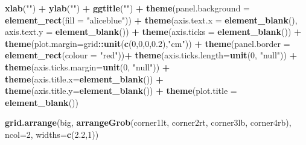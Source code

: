 \documentclass[12pt,oneside]{reedthesis}
\newenvironment{Shaded}{\begin{snugshade}}{\end{snugshade}}
\newcommand{\DataTypeTok}[1]{\textcolor[rgb]{0.13,0.29,0.53}{#1}}
\newcommand{\DecValTok}[1]{\textcolor[rgb]{0.00,0.00,0.81}{#1}}
\newcommand{\FloatTok}[1]{\textcolor[rgb]{0.00,0.00,0.81}{#1}}
\newcommand{\KeywordTok}[1]{\textcolor[rgb]{0.13,0.29,0.53}{\textbf{#1}}}
\newcommand{\NormalTok}[1]{#1}
\newcommand{\OperatorTok}[1]{\textcolor[rgb]{0.81,0.36,0.00}{\textbf{#1}}}
\newcommand{\StringTok}[1]{\textcolor[rgb]{0.31,0.60,0.02}{#1}}
\begin{document}
\begin{Shaded}
\begin{Highlighting}[]
\StringTok{  }\KeywordTok{xlab}\NormalTok{(}\StringTok{""}\NormalTok{) }\OperatorTok{+}\StringTok{ }
\StringTok{  }\KeywordTok{ylab}\NormalTok{(}\StringTok{""}\NormalTok{) }\OperatorTok{+}\StringTok{ }
\StringTok{  }\KeywordTok{ggtitle}\NormalTok{(}\StringTok{""}\NormalTok{) }\OperatorTok{+}
\StringTok{  }\KeywordTok{theme}\NormalTok{(}\DataTypeTok{panel.background =} \KeywordTok{element_rect}\NormalTok{(}\DataTypeTok{fill =} \StringTok{"aliceblue"}\NormalTok{)) }\OperatorTok{+}
\StringTok{  }\KeywordTok{theme}\NormalTok{(}\DataTypeTok{axis.text.x =} \KeywordTok{element_blank}\NormalTok{(), }\DataTypeTok{axis.text.y =} \KeywordTok{element_blank}\NormalTok{()) }\OperatorTok{+}
\StringTok{  }\KeywordTok{theme}\NormalTok{(}\DataTypeTok{axis.ticks =} \KeywordTok{element_blank}\NormalTok{()) }\OperatorTok{+}
\StringTok{  }\KeywordTok{theme}\NormalTok{(}\DataTypeTok{plot.margin=}\NormalTok{grid}\OperatorTok{::}\KeywordTok{unit}\NormalTok{(}\KeywordTok{c}\NormalTok{(}\DecValTok{0}\NormalTok{,}\DecValTok{0}\NormalTok{,}\DecValTok{0}\NormalTok{,}\FloatTok{0.2}\NormalTok{),}\StringTok{"cm"}\NormalTok{)) }\OperatorTok{+}\StringTok{ }
\StringTok{  }\KeywordTok{theme}\NormalTok{(}\DataTypeTok{panel.border =} \KeywordTok{element_rect}\NormalTok{(}\DataTypeTok{colour =} \StringTok{"red"}\NormalTok{))}\OperatorTok{+}
\StringTok{  }\KeywordTok{theme}\NormalTok{(}\DataTypeTok{axis.ticks.length=}\KeywordTok{unit}\NormalTok{(}\DecValTok{0}\NormalTok{, }\StringTok{"null"}\NormalTok{)) }\OperatorTok{+}
\StringTok{  }\KeywordTok{theme}\NormalTok{(}\DataTypeTok{axis.ticks.margin=}\KeywordTok{unit}\NormalTok{(}\DecValTok{0}\NormalTok{, }\StringTok{"null"}\NormalTok{)) }\OperatorTok{+}
\StringTok{  }\KeywordTok{theme}\NormalTok{(}\DataTypeTok{axis.title.x=}\KeywordTok{element_blank}\NormalTok{()) }\OperatorTok{+}
\StringTok{  }\KeywordTok{theme}\NormalTok{(}\DataTypeTok{axis.title.y=}\KeywordTok{element_blank}\NormalTok{()) }\OperatorTok{+}
\StringTok{  }\KeywordTok{theme}\NormalTok{(}\DataTypeTok{plot.title =} \KeywordTok{element_blank}\NormalTok{())}

\KeywordTok{grid.arrange}\NormalTok{(big, }\KeywordTok{arrangeGrob}\NormalTok{(corner1lt, corner2rt, corner3lb, corner4rb), }\DataTypeTok{ncol=}\DecValTok{2}\NormalTok{, }\DataTypeTok{widths=}\KeywordTok{c}\NormalTok{(}\FloatTok{2.2}\NormalTok{,}\DecValTok{1}\NormalTok{))}
\end{Highlighting}
\end{Shaded}
\normalsize
\end{document}
